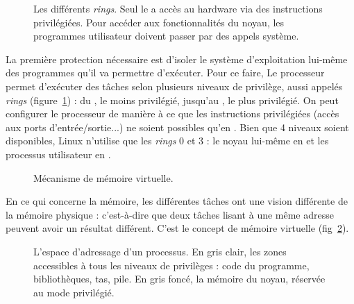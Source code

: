 \begin{figure}

\caption{Les différents \emph{rings}. Seul le  a accès au hardware
via des instructions privilégiées. Pour accéder aux fonctionnalités du noyau,
les programmes utilisateur doivent passer par des appels système.}
\label{fig:rings}
\end{figure}

La première protection nécessaire est d'isoler le système d'exploitation
lui-même des programmes qu'il va permettre d'exécuter. Pour ce faire, Le
processeur permet d'exécuter des tâches selon plusieurs niveaux de privilège,
aussi appelés \emph{rings} (figure~\ref{fig:rings}) : du , le
moins privilégié, jusqu'au , le plus privilégié. On peut configurer
le processeur de manière à ce que les instructions privilégiées (accès aux ports
d'entrée/sortie...) ne soient possibles qu'en . Bien que 4 niveaux
soient disponibles, Linux n'utilise que les \emph{rings} 0 et 3 : le noyau
lui-même en  et les processus utilisateur en .

\begin{figure}
\centering
{}
\caption{Mécanisme de mémoire virtuelle.}
\label{fig:memoire-virtuelle}
\end{figure}

En ce qui concerne la mémoire, les différentes tâches ont une vision différente
de la mémoire physique : c'est-à-dire que deux tâches lisant à une même adresse
peuvent avoir un résultat différent. C'est le concept de mémoire virtuelle
(fig~\ref{fig:memoire-virtuelle}).

\begin{figure}
\centering
\fbox{
  
}

\caption{L'espace d'adressage d'un processus. En gris clair, les zones
accessibles à tous les niveaux de privilèges : code du programme, bibliothèques,
tas, pile. En gris foncé, la mémoire du noyau, réservée au mode privilégié.}

\label{fig:memmap}
\end{figure}

